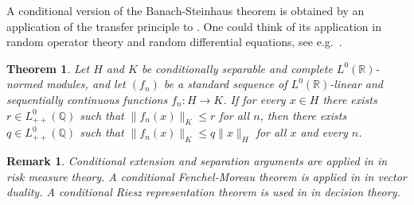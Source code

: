 \documentclass{jloganal}
\numberwithin{equation}{section}
\theoremstyle{plain}
\newtheorem{theorem}[subsection]{Theorem}
\newtheorem{remark}[subsection]{Remark}
\renewcommand{\leq}{\leqslant}
\renewcommand\R{\mathbb{R}}
\begin{document}
A conditional version of the Banach-Steinhaus theorem is obtained by an application of the transfer principle to \cite[Theorem II.10.8]{simpson2009subsystems}. 
One could think of its application in random operator theory and random differential equations, see e.g.~\cite{skorohod1983random,strand1970random}.  
\begin{theorem}
Let $H$ and $K$ be conditionally separable and complete $L^0(\R)$-normed modules, and let $(f_n)$ be a standard sequence of $L^0(\mathbb{R})$-linear and sequentially continuous functions $f_n\colon H\to K$.  
If for every $x\in H$ there exists $r\in L^0_{++}(\mathbb{Q})$ such that $\|f_n(x)\|_K\leq r$ for all $n$, then there exists $q\in L^0_{++}(\mathbb{Q})$ such that $\|f_n(x)\|_K\leq q \|x\|_H$ for all $x$ and every $n$.  
\end{theorem}


\begin{remark}
Conditional extension and separation arguments are applied in \cite{filipovic2012approaches,frittelli2014complete} in risk measure theory.  
A conditional Fenchel-Moreau theorem is applied in \cite{drapeau2017fenchel} in vector duality. 
A conditional Riesz representation theorem is used in \cite{drapeau2016conditional} in decision theory.  
\end{remark} 
\end{document}
